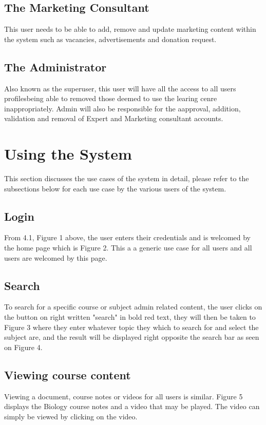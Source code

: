 \documentclass[12pt,a4paper]{article}
\begin{document}
		\subsection{The Marketing Consultant}
		 This user needs to be able to add, remove and update marketing content within the system such as vacancies, advertisements and donation request.
		 
		 
		 \subsection{The Administrator}
		 Also known as the superuser, this user will have all the access to all users profilesbeing able to removed those deemed to use the learing cenre inappropriately. Admin will also be responsible for the aapproval, addition, validation and removal of Expert and Marketing consultant accounts.
		 
	\section{Using the System}
	 This section discusses the use cases of the system in detail, please refer to the subsections below for each use case by the various users of the system.
	 	\subsection{Login}
	 	 From 4.1, Figure 1 above, the user enters their credentials and  is welcomed by the home page which is Figure 2. This a a generic use case for all users and all users are welcomed by this page.
	 	 
	 	 \subsection{Search}
	 	 To search for a specific course or subject admin related content, the user clicks on the button on right written "search" in bold red text, they will then be taken to Figure 3 where they enter whatever topic they which to search for and select the subject are, and the result will be displayed right opposite the search bar as seen on Figure 4.
	 	 
	 	 
	 	 
	 	 \subsection{Viewing course content}
		Viewing a document, course notes or videos for all users is similar. Figure 5 displays the Biology course notes and a video that may be played. The video can simply be viewed by clicking on the video.
		
\end{document}

